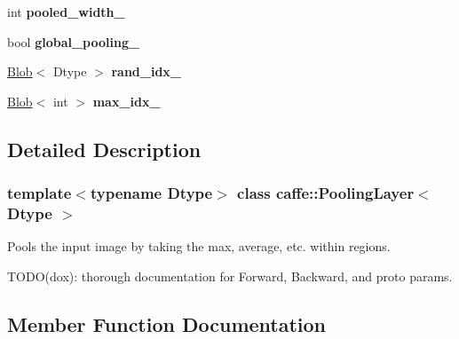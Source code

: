 \begin{DoxyCompactItemize}
\item 
\mbox{\label{classcaffe_1_1_pooling_layer_a73ddab9147f6ad736938a55a2dc74a0d}} 
int {\bfseries pooled\+\_\+width\+\_\+}
\item 
\mbox{\label{classcaffe_1_1_pooling_layer_a8b06277200752109a8aca5f53e84bd91}} 
bool {\bfseries global\+\_\+pooling\+\_\+}
\item 
\mbox{\label{classcaffe_1_1_pooling_layer_a0b7fe4632bb89d9b67d09bcf805007f0}} 
\mbox{\hyperlink{classcaffe_1_1_blob}{Blob}}$<$ Dtype $>$ {\bfseries rand\+\_\+idx\+\_\+}
\item 
\mbox{\label{classcaffe_1_1_pooling_layer_a5918a728a2b63f3293648a8cb7074246}} 
\mbox{\hyperlink{classcaffe_1_1_blob}{Blob}}$<$ int $>$ {\bfseries max\+\_\+idx\+\_\+}
\end{DoxyCompactItemize}


\subsection{Detailed Description}
\subsubsection*{template$<$typename Dtype$>$\newline
class caffe\+::\+Pooling\+Layer$<$ Dtype $>$}

Pools the input image by taking the max, average, etc. within regions. 

T\+O\+D\+O(dox)\+: thorough documentation for Forward, Backward, and proto params. 

\subsection{Member Function Documentation}
\mbox{\label{classcaffe_1_1_pooling_layer_a07dc8b1c3bfa3a997dd86b4e53f54019}} 

